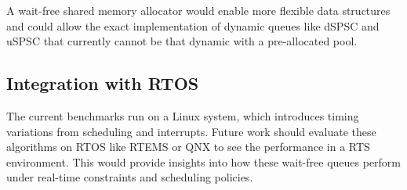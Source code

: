 A wait-free shared memory allocator would enable more flexible data structures and could allow the exact implementation of dynamic queues like \ac{dSPSC} and \ac{uSPSC} that currently cannot be that dynamic with a pre-allocated pool.

\subsection{Integration with \acf{RTOS}}
The current benchmarks run on a Linux system, which introduces timing variations from scheduling and interrupts. Future work should evaluate these algorithms on \ac{RTOS} like RTEMS or QNX to see the performance in a \ac{RTS} environment. This would provide insights into how these wait-free queues perform under real-time constraints and scheduling policies.